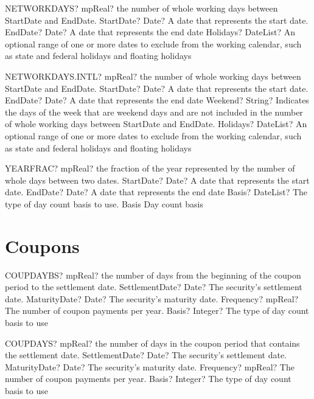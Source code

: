 \documentclass[12pt,a4paper,openany]{book}
\begin{document}
\begin{mpFunctionsExtract}
\mpWorksheetFunctionThreeNotImplemented
{NETWORKDAYS? mpReal? the number of whole working days between StartDate and EndDate.}
{StartDate? Date? A date that represents the start date.}
{EndDate? Date? A date that represents the end date}
{Holidays? DateList?  An optional range of one or more dates to exclude from the working calendar, such as state and federal holidays and floating holidays}
\end{mpFunctionsExtract}

\begin{mpFunctionsExtract}
\mpWorksheetFunctionThreeNotImplemented
{NETWORKDAYS.INTL? mpReal? the number of whole working days between StartDate and EndDate.}
{StartDate? Date? A date that represents the start date.}
{EndDate? Date? A date that represents the end date}
{Weekend? String? Indicates the days of the week that are weekend days and are not included in the number of whole working days between StartDate and EndDate.}
{Holidays? DateList?  An optional range of one or more dates to exclude from the working calendar, such as state and federal holidays and floating holidays}
\end{mpFunctionsExtract}

\begin{mpFunctionsExtract}
\mpWorksheetFunctionThreeNotImplemented
{YEARFRAC? mpReal? the fraction of the year represented by the number of whole days between two dates.}
{StartDate? Date? A date that represents the start date.}
{EndDate? Date? A date that represents the end date}
{Basis? DateList?  The type of day count basis to use. Basis Day count basis }
\end{mpFunctionsExtract}

\section{Coupons}

\begin{mpFunctionsExtract}
\mpWorksheetFunctionFourNotImplemented
{COUPDAYBS? mpReal? the number of days from the beginning of the coupon period to the settlement date.}
{SettlementDate? Date? The security's settlement date.}
{MaturityDate? Date? The security's maturity date.}
{Frequency? mpReal? The number of coupon payments per year.}
{Basis? Integer?  The type of day count basis to use}
\end{mpFunctionsExtract}

\begin{mpFunctionsExtract}
\mpWorksheetFunctionFourNotImplemented
{COUPDAYS? mpReal? the number of days in the coupon period that contains the settlement date.}
{SettlementDate? Date? The security's settlement date.}
{MaturityDate? Date? The security's maturity date.}
{Frequency? mpReal? The number of coupon payments per year.}
{Basis? Integer?  The type of day count basis to use}
\end{mpFunctionsExtract}
\end{document}
